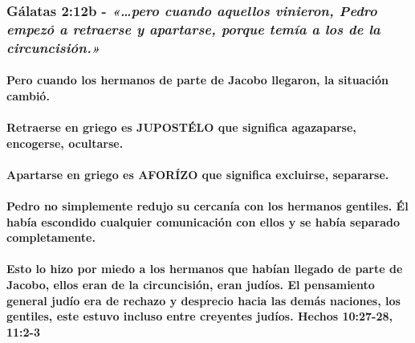 \documentclass[11a pt,twoside]{article}
\newcommand{\scripture}[1]{%
  {\fontsize{12pt}{16pt}\selectfont\ScriptureFont\itshape #1}%
}
\let\oldsubsubsection\subsubsection
\renewcommand{\subsubsection}{\needspace{4\baselineskip}\oldsubsubsection}
\let\oldparagraph\paragraph
\renewcommand{\paragraph}{\needspace{3\baselineskip}\oldparagraph}
\begin{document}
\subsubsection{\texorpdfstring{Gálatas 2:12b -
\scripture{«…pero cuando aquellos vinieron, Pedro empezó a retraerse y apartarse, porque temía a los de la circuncisión.»}}{Gálatas 2:12b - }}\label{guxe1latas-212b---pero-cuando-aquellos-vinieron-pedro-empezuxf3-a-retraerse-y-apartarse-porque-temuxeda-a-los-de-la-circuncisiuxf3n.}

\paragraph{Pero cuando los hermanos de parte de Jacobo llegaron, la
situación
cambió.}\label{pero-cuando-los-hermanos-de-parte-de-jacobo-llegaron-la-situaciuxf3n-cambiuxf3.}

\paragraph{Retraerse en griego es JUPOSTÉLO que significa agazaparse,
encogerse,
ocultarse.}\label{retraerse-en-griego-es-jupostuxe9lo-que-significa-agazaparse-encogerse-ocultarse.}

\paragraph{Apartarse en griego es AFORÍZO que significa excluirse,
separarse.}\label{apartarse-en-griego-es-aforuxedzo-que-significa-excluirse-separarse.}

\paragraph{Pedro no simplemente redujo su cercanía con los hermanos
gentiles. Él había escondido cualquier comunicación con ellos y se había
separado
completamente.}\label{pedro-no-simplemente-redujo-su-cercanuxeda-con-los-hermanos-gentiles.-uxe9l-habuxeda-escondido-cualquier-comunicaciuxf3n-con-ellos-y-se-habuxeda-separado-completamente.}

\paragraph{Esto lo hizo por miedo a los hermanos que habían llegado de
parte de Jacobo, ellos eran de la circuncisión, eran judíos. El
pensamiento general judío era de rechazo y desprecio hacia las demás
naciones, los gentiles, este estuvo incluso entre creyentes judíos.
Hechos 10:27-28,
11:2-3}\label{esto-lo-hizo-por-miedo-a-los-hermanos-que-habuxedan-llegado-de-parte-de-jacobo-ellos-eran-de-la-circuncisiuxf3n-eran-juduxedos.-el-pensamiento-general-juduxedo-era-de-rechazo-y-desprecio-hacia-las-demuxe1s-naciones-los-gentiles-este-estuvo-incluso-entre-creyentes-juduxedos.-hechos-1027-28-112-3}
\end{document}
